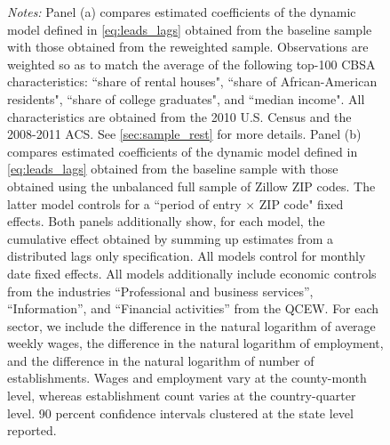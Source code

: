 \begin{figure}[htb!]
\begin{minipage}{0.95\textwidth}
		\textit{Notes:} Panel (a) compares estimated coefficients of the dynamic model defined in 
		\autoref{eq:leads_lags} obtained from the baseline sample with those obtained from the 
		reweighted sample. Observations are weighted so as to match the average of the following 
		top-100 CBSA characteristics: ``share of rental houses", ``share of African-American 
		residents", ``share of college graduates", and ``median income". All characteristics are 
		obtained from the 2010 U.S. Census and the 2008-2011 ACS. See \autoref{sec:sample_rest} for 
		more details. Panel (b) compares estimated coefficients of the dynamic model defined in 
		\autoref{eq:leads_lags} obtained from the baseline sample with those obtained using the 
		unbalanced full sample of Zillow ZIP codes. The latter model controls for a ``period of 
		entry $\times$ ZIP code" fixed effects. Both panels additionally show, for each model, the 
		cumulative effect obtained by summing up estimates from a distributed lags only specification. 
		All models control for monthly date fixed effects. All models additionally include economic 
		controls from the industries ``Professional and business services'', ``Information'', and 
		``Financial activities'' from the QCEW. For each sector, we include the difference in the 
		natural logarithm of average weekly wages, the difference in the natural logarithm of 
		employment, and the difference in the natural logarithm of number of establishments. Wages 
		and employment vary at the county-month level, whereas establishment count varies at the 
		country-quarter level.
		90 percent confidence intervals clustered at the state level reported. 
	\end{minipage}
\end{figure}


